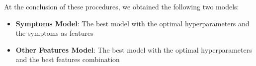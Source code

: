 At the conclusion of these procedures, we obtained the following two models:\\

\begin{itemize}
    \setlength\itemsep{0.4em} %
    \item \textbf{Symptoms Model}: The best model with the optimal hyperparameters and the symptoms as features
    \item \textbf{Other Features Model}: The best model with the optimal hyperparameters and the best features combination
\end{itemize}
\vspace{0.4cm}

